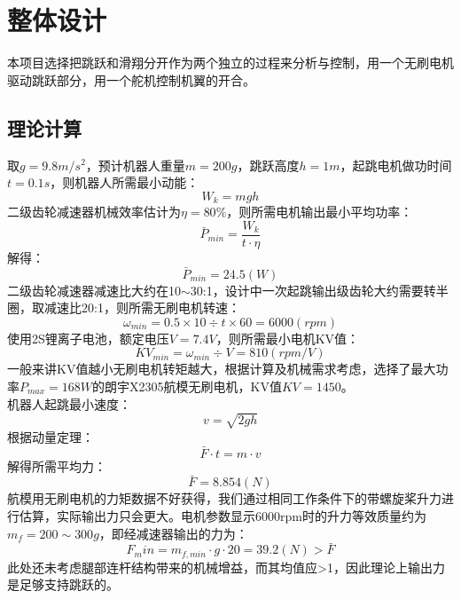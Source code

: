 
\chapter{整体设计}
\label{cha:chapter02}
本项目选择把跳跃和滑翔分开作为两个独立的过程来分析与控制，用一个无刷电机驱动跳跃部分，用一个舵机控制机翼的开合。
\section{理论计算}
\label{sec:calculations}
取$g=9.8m/s^2$，预计机器人重量$m=200g$，跳跃高度$h=1m$，起跳电机做功时间$t=0.1s$，则机器人所需最小动能：
\begin{equation}
\label{equ:chap2:W_calc}
W_k=mgh
\end{equation}
二级齿轮减速器机械效率估计为$\eta=80\%$，则所需电机输出最小平均功率：
\begin{equation}
  \label{equ:chap2:P_calc}
  \bar{P}_{min}=\frac{W_k}{t·\eta}
  \end{equation}
解得：$$\bar{P}_{min}=24.5(W)$$
二级齿轮减速器减速比大约在10$\sim$30:1，设计中一次起跳输出级齿轮大约需要转半圈，取减速比20:1，则所需无刷电机转速：
$$\omega_{min}=0.5\times10\div t\times60=6000(rpm)$$
使用2S锂离子电池，额定电压$V=7.4V$，则所需最小电机KV值：
$$KV_{min}=\omega_{min}\div V=810(rpm/V)$$
一般来讲KV值越小无刷电机转矩越大，根据计算及机械需求考虑，选择了最大功率$P_{max}=168W$的朗宇X2305航模无刷电机，KV值$KV=1450$。\\
机器人起跳最小速度：
\begin{equation}
  \label{equ:chap2:v_calc}
  v=\sqrt{2gh}
  \end{equation}
根据动量定理：
\begin{equation}
  \label{equ:chap2:motion_principle}
  \bar{F}·t=m·v
  \end{equation}
解得所需平均力：$$\bar{F}=8.854(N)$$
航模用无刷电机的力矩数据不好获得，我们通过相同工作条件下的带螺旋桨升力进行估算，实际输出力只会更大。电机参数显示6000rpm时的升力等效质量约为$m_f=200\sim300g$，即经减速器输出的力为：$$F_min=m_{f,min}·g·20=39.2(N)>\bar{F}$$
此处还未考虑腿部连杆结构带来的机械增益，而其均值应>1，因此理论上输出力是足够支持跳跃的。
